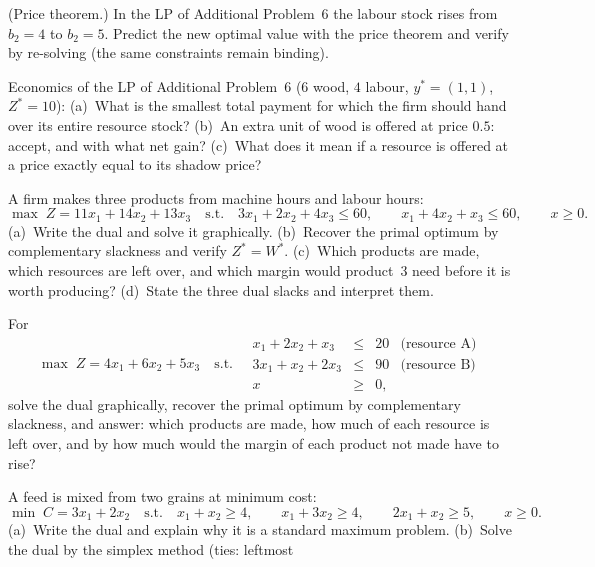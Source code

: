 \begin{problems}
  \item (Price theorem.) In the LP of Additional Problem~6 the labour
        stock rises from $b_{2}=4$ to $b_{2}=5$. Predict the new optimal
        value with the price theorem and verify by re-solving (the same
        constraints remain binding).
  \item Economics of the LP of Additional Problem~6 ($6$ wood, $4$
        labour, $y^{*}=(1,1)$, $Z^{*}=10$):
        (a)~What is the smallest total payment for which the firm should
        hand over its entire resource stock?
        (b)~An extra unit of wood is offered at price $0.5$: accept, and
        with what net gain?
        (c)~What does it mean if a resource is offered at a price exactly
        equal to its shadow price?
  \item A firm makes three products from machine hours and labour hours:
        \[
          \max\; Z=11x_{1}+14x_{2}+13x_{3}
          \quad\text{s.t.}\quad
          3x_{1}+2x_{2}+4x_{3}\le 60,\qquad
          x_{1}+4x_{2}+x_{3}\le 60,\qquad x\ge 0 .
        \]
        (a)~Write the dual and solve it graphically.
        (b)~Recover the primal optimum by complementary slackness and
        verify $Z^{*}=W^{*}$.
        (c)~Which products are made, which resources are left over, and
        which margin would product~3 need before it is worth producing?
        (d)~State the three dual slacks and interpret them.
  \item For
        \[
          \max\; Z=4x_{1}+6x_{2}+5x_{3}
          \quad\text{s.t.}\quad
          \begin{array}{rcll}
            x_{1}+2x_{2}+x_{3} &\le& 20 & \text{(resource A)}\\
            3x_{1}+x_{2}+2x_{3} &\le& 90 & \text{(resource B)}\\
            x &\ge& 0,
          \end{array}
        \]
        solve the dual graphically, recover the primal optimum by
        complementary slackness, and answer: which products are made, how
        much of each resource is left over, and by how much would the
        margin of each product not made have to rise?
  \item A feed is mixed from two grains at minimum cost:
        \[
          \min\; C=3x_{1}+2x_{2}
          \quad\text{s.t.}\quad
          x_{1}+x_{2}\ge 4,\qquad x_{1}+3x_{2}\ge 4,\qquad
          2x_{1}+x_{2}\ge 5,\qquad x\ge 0 .
        \]
        (a)~Write the dual and explain why it is a standard maximum
        problem. (b)~Solve the dual by the simplex method (ties: leftmost

\end{problems}
